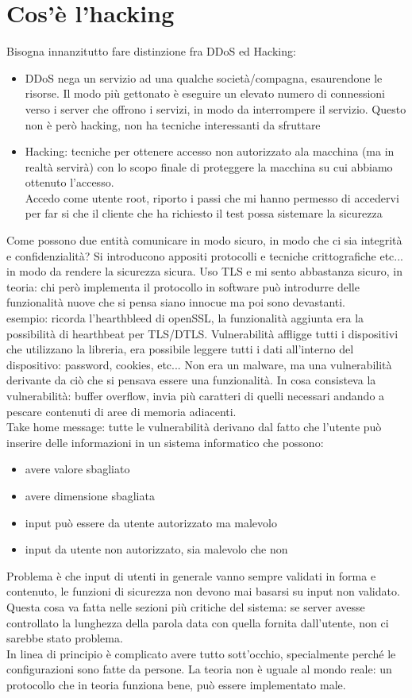 \documentclass{article}
\begin{document}
\Large
\tableofcontents
\section{Cos'è l'hacking}
Bisogna innanzitutto fare distinzione fra DDoS ed Hacking:
\begin{itemize}
\item DDoS nega un servizio ad una qualche società/compagna, esaurendone le risorse. Il modo più gettonato è eseguire un elevato numero di connessioni verso i server che offrono i servizi, in modo da interrompere il servizio. Questo non è però hacking, non ha tecniche interessanti da sfruttare
\item Hacking: tecniche per ottenere accesso non autorizzato ala macchina (ma in realtà servirà) con lo scopo finale di proteggere la macchina su cui abbiamo ottenuto l'accesso.\\ Accedo come utente root, riporto i passi che mi hanno permesso di accedervi per far si che il cliente che ha richiesto il test possa sistemare la sicurezza
\end{itemize}
Come possono due entità comunicare in modo sicuro, in modo che ci sia integrità e confidenzialità? Si introducono appositi protocolli e tecniche crittografiche etc... in modo da rendere la sicurezza sicura. Uso TLS e mi sento abbastanza sicuro, in teoria: chi però implementa il protocollo in software può introdurre delle funzionalità nuove che si pensa siano innocue ma poi sono devastanti.\\ esempio: ricorda l'hearthbleed di openSSL, la funzionalità aggiunta era la possibilità di hearthbeat per TLS/DTLS. Vulnerabilità affligge tutti i dispositivi che utilizzano la libreria, era possibile leggere tutti i dati all'interno del dispositivo: password, cookies, etc... Non era un malware, ma una vulnerabilità derivante da ciò che si pensava essere una funzionalità. In cosa consisteva la vulnerabilità: buffer overflow, invia più caratteri di quelli necessari andando a pescare contenuti di aree di memoria adiacenti.\\ Take home message: tutte le vulnerabilità derivano dal fatto che l'utente può inserire delle informazioni in un sistema informatico che possono:
\begin{itemize}
\item avere valore sbagliato
\item avere dimensione sbagliata
\item input può essere da utente autorizzato ma malevolo
\item input da utente non autorizzato, sia malevolo che non
\end{itemize}
Problema è che input di utenti in generale vanno sempre validati in forma e contenuto, le funzioni di sicurezza non devono mai basarsi su input non validato. Questa cosa va fatta nelle sezioni più critiche del sistema: se server avesse controllato la lunghezza della parola data con quella fornita dall'utente, non ci sarebbe stato problema.\\ In linea di principio è complicato avere tutto sott'occhio, specialmente perché le configurazioni sono fatte da persone. La teoria non è uguale al mondo reale: un protocollo che in teoria funziona bene, può essere implementato male.
\end{document}
